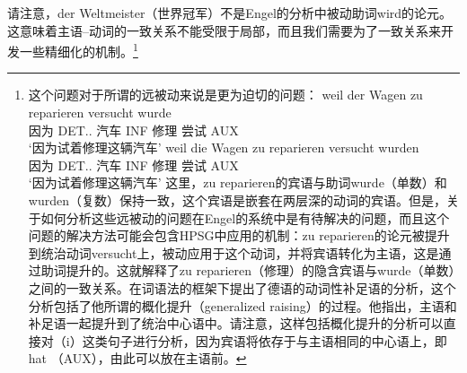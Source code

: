 请注意，der Weltmeister（世界冠军）不是Engel的分析中被动助词wird的论元。这意味着主语--动词的一致关系不能受限于局部，而且我们需要为了一致关系来开发一些精细化的机制。\footnote{%
这个问题对于所谓的远被动来说是更为迫切的问题：
\eal
\ex
\gll weil der Wagen zu reparieren versucht wurde\\
     因为 DET.\sg.\nom{} 汽车 INF 修理 尝试 AUX\\
\glt `因为试着修理这辆汽车'
\ex
\gll weil die Wagen zu reparieren versucht wurden\\
     因为 DET.\pl.\nom{} 汽车 INF 修理 尝试 AUX\\
\glt `因为试着修理这辆汽车'
\zl
这里，zu reparieren的宾语与助词wurde（单数）和wurden（复数）保持一致，这个宾语是嵌套在两层深的动词的宾语。但是，关于如何分析这些远被动的问题在Engel的系统中是有待解决的问题，而且这个问题的解决方法可能会包含HPSG中应用的机制：zu reparieren的论元被提升到统治动词versucht上，被动应用于这个动词，并将宾语转化为主语，这是通过助词提升的。这就解释了zu reparieren（修理）的隐含宾语与wurde（单数）之间的一致关系。\citet{Hudson97a}在词语法的框架下提出了德语的动词性补足语的分析，这个分析包括了他所谓的概化提升（generalized raising）的过程。他指出，主语和补足语一起提升到了统治中心语中。请注意，这样包括概化提升的分析可以直接对（i）这类句子进行分析，因为宾语将依存于与主语相同的中心语上，即hat （AUX），由此可以放在主语前。
}
